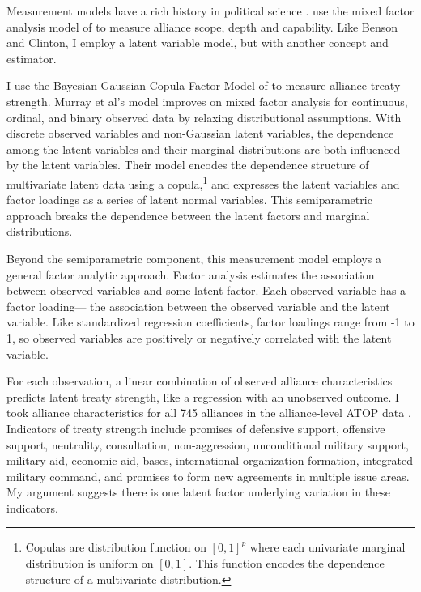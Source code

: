\documentclass[12pt]{article}
\begin{document}
Measurement models have a rich history in political science \citep{Clintonetal2004, TreierJackman2008, Fariss2014}. 
\citet{BensonClinton2016} use the mixed factor analysis model of \citet{Quinn2004} to measure alliance scope, depth and capability.
Like Benson and Clinton, I employ a latent variable model, but with another concept and estimator. 


I use the Bayesian Gaussian Copula Factor Model of \citet{Murrayetal2013} to measure alliance treaty strength. 
Murray et al's model improves on mixed factor analysis for continuous, ordinal, and binary observed data by relaxing distributional assumptions. 
With discrete observed variables and non-Gaussian latent variables, the dependence among the latent variables and their marginal distributions are both influenced by the latent variables.
Their model encodes the dependence structure of multivariate latent data using a copula,\footnote{Copulas are distribution function on $[0, 1]^p$ where each univariate marginal distribution is uniform on $[0,1]$. This function encodes the dependence structure of a multivariate distribution.} and expresses the latent variables and factor loadings as a series of latent normal variables. 
This semiparametric approach breaks the dependence between the latent factors and marginal distributions. 


Beyond the semiparametric component, this measurement model employs a general factor analytic approach.
Factor analysis estimates the association between observed variables and some latent factor.
Each observed variable has a factor loading--- the association between the observed variable and the latent variable.  
Like standardized regression coefficients, factor loadings range from -1 to 1, so observed variables are positively or negatively correlated with the latent variable.  


For each observation, a linear combination of observed alliance characteristics predicts latent treaty strength, like a regression with an unobserved outcome.  
I took alliance characteristics for all 745 alliances in the alliance-level ATOP data \citep{Leedsetal2002}. 
Indicators of treaty strength include promises of defensive support, offensive support, neutrality, consultation, non-aggression, unconditional military support, military aid, economic aid, bases, international organization formation, integrated military command, and promises to form new agreements in multiple issue areas. 
My argument suggests there is one latent factor underlying variation in these indicators.
\end{document}
